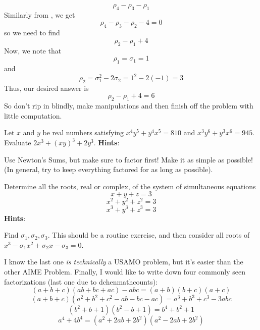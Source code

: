 \documentclass[11pt,titlepage]{scrartcl}
\newenvironment{hint}{\footnotesize \normalfont \textbf{Hints}:}{\hspace{-0.5ex}}
\begin{document}
\[\rho_4-\rho_3-\rho_1\]
Similarly from , we get
\[\rho_4-\rho_3-\rho_2-4=0\]
so we need to find
\[\rho_2-\rho_1+4\]
Now, we note that
\[\rho_1=\sigma_1=1\]
and
\[\rho_2=\sigma_1^2-2\sigma_2=1^2-2(-1)=3\]
Thus, our desired answer is
\[\rho_2-\rho_1+4=\boxed{6}\]
So don't rip in blindly, make manipulations and then finish off the problem with little computation.
\begin{exercisebox}
\begin{exercise}
Let $x$ and $y$ be real numbers satisfying $x^4y^5+y^4x^5=810$ and $x^3y^6+y^3x^6=945$. Evaluate $2x^3+(xy)^3+2y^3$.
\begin{hint}
\begin{addhint}{
Use Newton's Sums, but make sure to factor first! Make it as simple as possible! (In general, try to keep everything factored for as long as possible).
}\end{addhint}
\end{hint}
\end{exercise}
\begin{exercise}
Determine all the roots, real or complex, of the system of simultaneous equations
\[x+y+z=3\]
\[x^2+y^2+z^2=3\]
\[x^3+y^3+z^3=3\]
\begin{hint}
\begin{addhint}{
Find $\sigma_1,\sigma_2,\sigma_3$. This should be a routine exercise, and then consider all roots of $x^3-\sigma_1x^2+\sigma_2x-\sigma_3=0$.
}\end{addhint}
\end{hint}
\end{exercise}
\end{exercisebox}
I know the last one \textit{is technically} a USAMO problem, but it's easier than the other AIME Problem. Finally, I would like to write down four commonly seen factorizations (last one due to dchenmathcounts):
\[(a+b+c)(ab+bc+ac)-abc=(a+b)(b+c)(a+c)\]
\[(a+b+c)(a^2+b^2+c^2-ab-bc-ac)=a^3+b^3+c^3-3abc\]
\[(b^2+b+1)(b^2-b+1)=b^4+b^2+1\]
\[a^4+4b^4=(a^2+2ab+2b^2)(a^2-2ab+2b^2)\]
\end{document}
